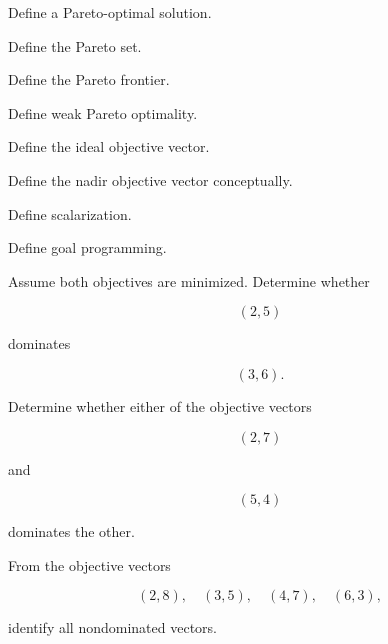 \begin{exercise}[1]
Define a Pareto-optimal solution.
\end{exercise}

\begin{exercise}[1]
Define the Pareto set.
\end{exercise}

\begin{exercise}[1]
Define the Pareto frontier.
\end{exercise}

\begin{exercise}[1]
Define weak Pareto optimality.
\end{exercise}

\begin{exercise}[1]
Define the ideal objective vector.
\end{exercise}

\begin{exercise}[1]
Define the nadir objective vector conceptually.
\end{exercise}

\begin{exercise}[1]
Define scalarization.
\end{exercise}

\begin{exercise}[1]
Define goal programming.
\end{exercise}

\begin{exercise}[2]
Assume both objectives are minimized. Determine whether

\[
(2,5)
\]

dominates

\[
(3,6).
\]
\end{exercise}

\begin{exercise}[2]
Determine whether either of the objective vectors

\[
(2,7)
\]

and

\[
(5,4)
\]

dominates the other.
\end{exercise}

\begin{exercise}[2]
From the objective vectors

\[
(2,8),
\quad
(3,5),
\quad
(4,7),
\quad
(6,3),
\]

identify all nondominated vectors.
\end{exercise}

